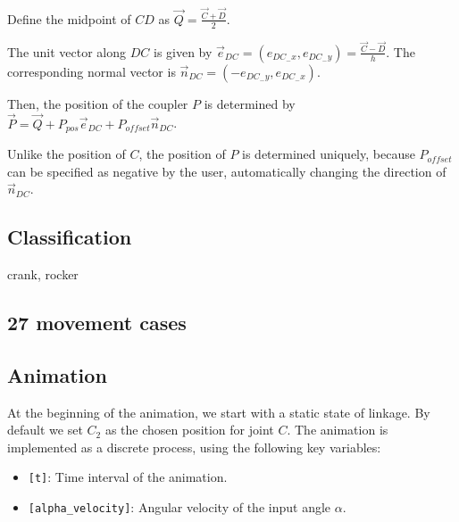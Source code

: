 \documentclass{article}
\begin{document}
\begin{itemize}
 	Define the midpoint of $CD$ as $\overrightarrow{Q} = \frac{\overrightarrow{C} + \overrightarrow{D}}{2}$.
 	
 	The unit vector along $DC$ is given by $\overrightarrow{e}_{DC} = (e_{DC_-x}, e_{DC_-y}) = \frac{\overrightarrow{C} - \overrightarrow{D}}{h}$. The corresponding normal vector is $\overrightarrow{n}_{DC} = (-e_{DC_-y}, e_{DC_-x})$.
 	
 	Then, the position of the coupler $P$ is determined by $\overrightarrow{P} = \overrightarrow{Q} + P_{pos} \overrightarrow{e}_{DC} + P_{offset} \overrightarrow{n}_{DC}$.
 	
 	Unlike the position of $C$, the position of $P$ is determined uniquely, because $P_{offset}$ can be specified as negative by the user, automatically changing the direction of $\overrightarrow{n}_{DC}$.
 \end{itemize}


 \subsection{Classification}
 crank, rocker
 
 \subsection{27 movement cases}
 

 \subsection{Animation}

 At the beginning of the animation, we start with a static state of linkage. By default we set $C_2$ as the chosen position for joint $C$.
 The animation is implemented as a discrete process, using the following key variables:
 \begin{itemize}
	 \item \texttt{[t]}: Time interval of the animation.
	 \item \texttt{[alpha\_velocity]}: Angular velocity of the input angle $\alpha$.
 \end{itemize}
\end{document}
